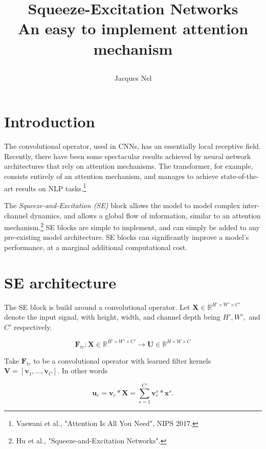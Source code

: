 \documentclass[6pt,oneside]{article}
\title{{\bf Squeeze-Excitation Networks\\An easy to implement attention mechanism}\\\vspace{10pt}     
    \author{Jacques Nel}
}
\newcommand{\Real}{\mathbb{R}}
\newcommand{\vect}[1]{\boldsymbol{#1}}
\begin{document}
\maketitle

\section{Introduction}

The convolutional operator, used in CNNs, has an essentially local receptive field.
Recently, there have been some spectacular results achieved by neural network architectures that rely
on attention mechanisms. The transformer, for example, consists entirely of an attention mechanism,
and manages to achieve state-of-the-art results on NLP tasks.\footnote{Vaswani et al., "Attention Is All You Need", NIPS 2017.}

The \emph{Squeeze-and-Excitation (SE)} block allows the model to model complex inter-channel dynamics, and
allows a global flow of information, similar to an attention mechanism.\footnote{Hu et al., "Squeeze-and-Excitation Networks".}
SE blocks are simple to implement, and can simply be added to any pre-existing model architecture. SE
blocks can significantly improve a model's performance, at a marginal additional computational cost.

\section{SE architecture}

The SE block is build around a convolutional operator. Let
$\vect{X}\in\Real^{H'\times W' \times C'}$ denote the input signal, with height, width, and channel depth being $H', W',$ and $C'$
respectively.

$$
\vect{F}_{tr} : \vect{X} \in \Real^{H'\times W'\times C'}\rightarrow \vect{U}\in\Real^{H\times W\times C}
$$

Take $\vect{F}_{tr}$ to be a convolutional operator with learned filter kernels
$\vect{V}=\left[ \vect{v}_1, \ldots, \vect{v}_C\right]$. In other words

$$
\vect{u}_c = \vect{v}_c \ast \vect{X} = \sum_{s=1}^{C'} \vect{v}_c^s \ast \vect{x}^s.
$$
\end{document}
